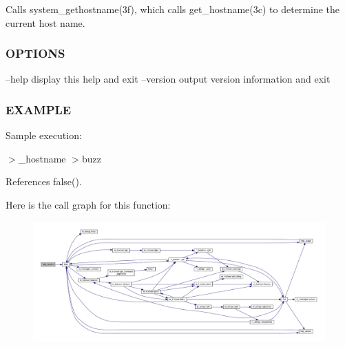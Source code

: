 Calls system\+\_\+gethostname(3f), which calls get\+\_\+hostname(3c) to determine the current host name. \subsubsection*{O\+P\+T\+I\+O\+NS}

--help display this help and exit --version output version information and exit \subsubsection*{E\+X\+A\+M\+P\+LE}

Sample execution\+:

$>$\+\_\+hostname $>$buzz 

References false().

Here is the call graph for this function\+:
\nopagebreak
\begin{figure}[H]
\begin{center}
\leavevmode
\includegraphics[width=350pt]{__hostname_8f90_a39c21619b08a3c22f19e2306efd7f766_cgraph}
\end{center}
\end{figure}

